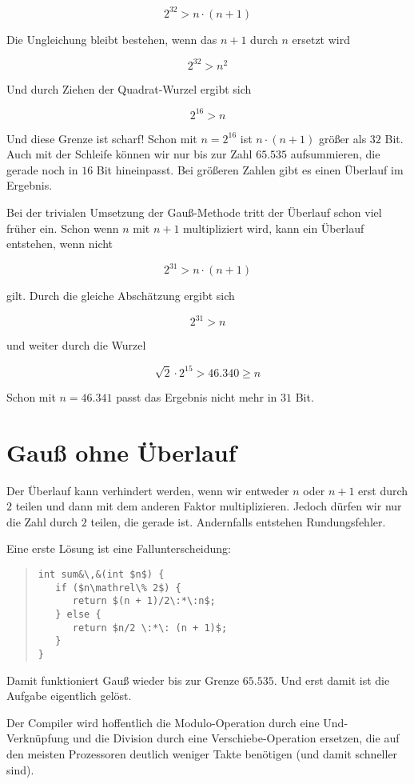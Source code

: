 \documentclass[a5paper,landscape,ngerman,10pt]{article}
\begin{document}
\[2^{32} > n\cdot(n+1)\]

Die Ungleichung bleibt bestehen, wenn das $n+1$ durch $n$
ersetzt wird

\[2^{32} > n^2\]

Und durch Ziehen der Quadrat-Wurzel ergibt sich

\[2^{16} > n\]

Und diese Grenze ist scharf! Schon mit $n=2^{16}$ ist
$n\cdot(n+1)$ größer als $32$ Bit.
Auch mit der Schleife können wir nur bis zur Zahl $65.535$
aufsummieren, die gerade noch in $16$ Bit hineinpasst.
Bei größeren Zahlen gibt es einen Überlauf im Ergebnis.

Bei der trivialen Umsetzung der Gauß-Methode tritt der
Überlauf schon viel früher ein.
Schon wenn $n$ mit $n+1$ multipliziert wird, kann ein
Überlauf entstehen, wenn nicht

\[2^{31}>n\cdot(n+1)\]

gilt.
Durch die gleiche Abschätzung ergibt sich

\[2^{31}>n\]

und weiter durch die Wurzel

\[\sqrt{2}\cdot2^{15}>46.340\geq n\]

Schon mit $n=46.341$ passt das Ergebnis nicht mehr in $31$ Bit.

\section{Gauß ohne Überlauf}

Der Überlauf kann verhindert werden, wenn wir entweder $n$ oder
$n+1$ erst durch $2$ teilen und dann mit dem anderen Faktor
multiplizieren.
Jedoch dürfen wir nur die Zahl durch $2$ teilen, die gerade
ist.
Andernfalls entstehen Rundungsfehler.

Eine erste Lösung ist eine Fallunterscheidung:

\begin{quotation}
\begin{lstlisting}
int sum&\,&(int $n$) {
   if ($n\mathrel\% 2$) {
      return $(n + 1)/2\:*\:n$;
   } else {
      return $n/2 \:*\: (n + 1)$;
   }
}
\end{lstlisting}
\end{quotation}

Damit funktioniert Gauß wieder bis zur Grenze $65.535$.
Und erst damit ist die Aufgabe eigentlich gelöst.

Der Compiler wird hoffentlich die Modulo-Operation durch eine
Und-Verknüpfung und die Division durch eine
Verschiebe-Operation ersetzen, die auf den meisten
Prozessoren deutlich weniger Takte benötigen (und damit
schneller sind).
\end{document}
